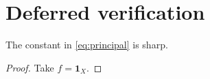 
\section{Deferred verification}
\label{app:deferred}

\begin{lemma}
\label{lem:sharp}
The constant in \cref{eq:principal} is sharp.
\end{lemma}

\begin{proof}
Take $f = \mathbf{1}_X$.
\end{proof}
